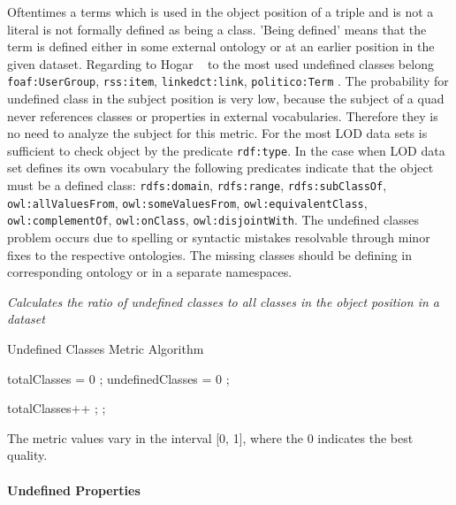 {{Oftentimes a terms which is used in the object position of a triple and is not a literal is not formally defined as being a class.
'Being defined' means that the term is defined either in some external ontology or at an earlier position in the given dataset. 
Regarding to Hogar ~\cite{hogan2010} to the most used undefined classes belong \texttt{foaf:UserGroup}, \texttt{rss:item}, \texttt{linkedct:link}, \texttt{politico:Term} .
The probability for undefined class in the subject position is very low, because the subject of a quad never references classes or properties in external vocabularies.
Therefore they is no need to analyze the subject for this metric.
For the most LOD data sets is sufficient to check object by the predicate \texttt{rdf:type}. 
In the case when LOD data set defines its own vocabulary the following predicates indicate that the object must be a defined class:  \texttt{rdfs:domain}, \texttt{rdfs:range}, \texttt{rdfs:subClassOf}, \texttt{owl:allValuesFrom}, \texttt{owl:someValuesFrom}, \texttt{owl:equivalentClass}, \texttt{owl:complementOf}, \texttt{owl:onClass}, \texttt{owl:disjointWith}.
The undefined classes problem occurs due to spelling or syntactic mistakes resolvable through minor fixes to the respective ontologies.
The missing classes should be defining in corresponding ontology or in a separate namespaces.


\begin{mdframed}[style=metricdefinition]
\emph{Calculates the ratio of undefined classes to all classes in the object position in a dataset}
\end{mdframed}


\begin{algorithm}
\caption{Undefined Classes Metric Algorithm}\label{lst:undefCl}
\begin{algorithmic}[1]
\State totalClasses = 0 ;
\State undefinedClasses = 0 ;
\EndProcedure

  totalClasses++ ;\EndIf
{}; \EndIf
{}
\EndProcedure
\end{algorithmic}
\end{algorithm}

The metric values vary in the interval [0, 1], where  the 0 indicates the best quality.


\paragraph{Undefined Properties}  ~\\ 


}}
